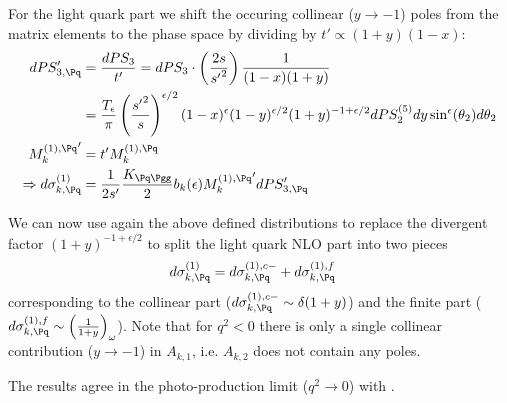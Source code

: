 For the light quark part we shift the occuring collinear ($y\rightarrow -1$) poles from the matrix elements to the phase space by dividing by $t'\propto(1+y)(1-x)$:
\begin{align}
dPS_{3,\Pq}' &= \frac{dPS_3}{t'} = dPS_3 \cdot \left(\frac {2s}{{s'}^2}\right)\frac 1 {(1-x)(1+y)}\\
 &= \frac {T_\epsilon}{\pi} \left(\frac {{s'}^2} s\right)^{\epsilon/2} (1-x)^{\epsilon}(1-y)^{\epsilon/2}(1+y)^{-1+\epsilon/2}dPS_2^{(5)}dy \sin^\epsilon(\theta_2)d\theta_2\\
{M_k^{(1),\Pq}}' &= t'M_k^{(1),\Pq}\\
\Rightarrow d\sigma_{k,\Pq}^{(1)} &= \frac{1}{2s'}\frac {K_{\Pq\Pgg}} 2 b_k(\epsilon) {M_k^{(1),\Pq}}' dPS_{3,\Pq}'
\end{align}

We can now use again the above defined distributions to replace the divergent factor $(1+y)^{-1+\epsilon/2}$ to split the light quark NLO part into two pieces\cite{Harris:1995tu}
\begin{align}
d\sigma_{k,\Pq}^{(1)} &= d\sigma_{k,\Pq}^{(1),c-} + d\sigma_{k,\Pq}^{(1),f}
\end{align}
corresponding to the collinear part ($d\sigma_{k,\Pq}^{(1),c-} \sim \delta(1+y)$) and the finite part ($d\sigma_{k,\Pq}^{(1),f}\sim\left(\frac 1 {1+y}\right)_\omega$). Note that for $q^2 < 0$ there is only a single collinear contribution ($y\rightarrow -1$) in $A_{k,1}$, i.e. $A_{k,2}$ does not contain any poles.

The results agree in the photo-production limit ($q^2\rightarrow 0$) with \cite{Bojak:1998zm}.
